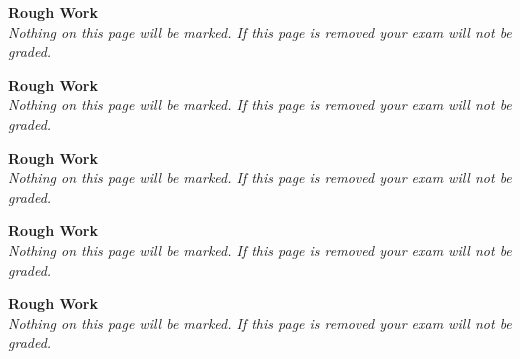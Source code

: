 \clearpage
\begin{center}
\textbf{Rough Work}\\
\emph{Nothing on this page will be marked. If this page is removed your exam will not be graded.}
\end{center}
\clearpage

\clearpage
\begin{center}
\textbf{Rough Work}\\
\emph{Nothing on this page will be marked. If this page is removed your exam will not be graded.}
\end{center}
\clearpage

\clearpage
\begin{center}
\textbf{Rough Work}\\
\emph{Nothing on this page will be marked. If this page is removed your exam will not be graded.}
\end{center}
\clearpage

\clearpage
\begin{center}
\textbf{Rough Work}\\
\emph{Nothing on this page will be marked. If this page is removed your exam will not be graded.}
\end{center}
\clearpage

\clearpage
\begin{center}
\textbf{Rough Work}\\
\emph{Nothing on this page will be marked. If this page is removed your exam will not be graded.}
\end{center}
\clearpage

